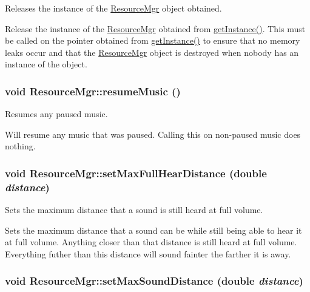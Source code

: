 Releases the instance of the \hyperlink{class_resource_mgr}{ResourceMgr} object obtained. 

Release the instance of the \hyperlink{class_resource_mgr}{ResourceMgr} obtained from \hyperlink{class_resource_mgr_ec5d2a10ae64caa3ad718ba9881acd0a}{getInstance()}. This must be called on the pointer obtained from \hyperlink{class_resource_mgr_ec5d2a10ae64caa3ad718ba9881acd0a}{getInstance()} to ensure that no memory leaks occur and that the \hyperlink{class_resource_mgr}{ResourceMgr} object is destroyed when nobody has an instance of the object. \hypertarget{class_resource_mgr_f05542181d4d0464f549a1acac304151}{
\subsubsection[{resumeMusic}]{\setlength{\rightskip}{0pt plus 5cm}void ResourceMgr::resumeMusic ()}}
\label{class_resource_mgr_f05542181d4d0464f549a1acac304151}


Resumes any paused music. 

Will resume any music that was paused. Calling this on non-paused music does nothing. \hypertarget{class_resource_mgr_d1461da9add565c7a7c363da051c8111}{
\subsubsection[{setMaxFullHearDistance}]{\setlength{\rightskip}{0pt plus 5cm}void ResourceMgr::setMaxFullHearDistance (double {\em distance})}}
\label{class_resource_mgr_d1461da9add565c7a7c363da051c8111}


Sets the maximum distance that a sound is still heard at full volume. 

Sets the maximum distance that a sound can be while still being able to hear it at full volume. Anything closer than that distance is still heard at full volume. Everything futher than this distance will sound fainter the farther it is away. \hypertarget{class_resource_mgr_79ba3b60c9aa385d450bb29e6404582f}{
\subsubsection[{setMaxSoundDistance}]{\setlength{\rightskip}{0pt plus 5cm}void ResourceMgr::setMaxSoundDistance (double {\em distance})}}
\label{class_resource_mgr_79ba3b60c9aa385d450bb29e6404582f}


